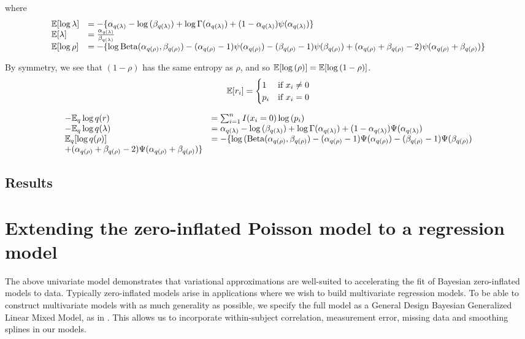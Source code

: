 \documentclass{amsart}
\begin{document}
where
$$
\begin{array}{ll}
{\mathbb E} [\log{\lambda}] &= -\{ \alpha_{q(\lambda)} - \log{(\beta_{q(\lambda)})} + \log{\Gamma(\alpha_{q(\lambda)})} + (1 - \alpha_{q(\lambda)}) \psi{(\alpha_{q(\lambda)})} \} \\
{\mathbb E} [\lambda] &= \frac{\alpha_{q(\lambda)}}{\beta_{q(\lambda)}} \\
{\mathbb E}[\log{\rho}] &= - \{ \log{\text{Beta}(\alpha_{q(\rho)}, \beta_{q(\rho)})} - (\alpha_{q(\rho)} - 1) \psi{(\alpha_{q(\rho)})} - (\beta_{q(\rho)} - 1)\psi{(\beta_{q(\rho)})} + (\alpha_{q(\rho)} + \beta_{q(\rho)} - 2)\psi{(\alpha_{q(\rho)} + \beta_{q(\rho)})} \} \\
\end{array}
$$

By symmetry, we see that $(1 - \rho)$ has the same entropy as $\rho$,
and so ${\mathbb E} [\log{(\rho)}] = {\mathbb E} [\log{(1 - \rho)}]$.
$$
{\mathbb E}[r_i] = 
	\begin{cases}
	1 & \text{if } x_i \ne 0 \\
	p_i & \text{if } x_i = 0 \\
	\end{cases}
$$

$$
\begin{array}{ll}
-{\mathbb E}_q \log{q(r)} &= \sum_{i=1}^n I(x_i = 0) \log{(p_i)} \\
-{\mathbb E}_q \log{q(\lambda)} &= \alpha_{q(\lambda)} - \log{(\beta_{q(\lambda)})} + \log{\Gamma{(\alpha_{q(\lambda)})}} + (1 - \alpha_{q(\lambda)}) \Psi{(\alpha_{q(\lambda)})} \\
{\mathbb E}_q[\log{q(\rho)}] &= - \{ \log{(\text{Beta}(\alpha_{q(\rho)}, \beta_{q(\rho)})} - (\alpha_{q(\rho)} - 1) \Psi{(\alpha_{q(\rho)})} - (\beta_{q(\rho)} - 1)\Psi{(\beta_{q(\rho)})} \\
+ (\alpha_{q(\rho)} + \beta_{q(\rho)} - 2)\Psi{(\alpha_{q(\rho)} + \beta_{q(\rho)})} \} \\
\end{array}
$$

\subsection{Results}

\section{Extending the zero-inflated Poisson model to a regression model}
The above univariate model demonstrates that variational approximations are well-suited
to accelerating the fit of Bayesian zero-inflated models to data. Typically zero-inflated
models arise in applications where we wish to build multivariate regression models. To be able to
construct multivariate models with as much generality as possible, we specify the full
model as a General Design Bayesian Generalized Linear Mixed Model, as in \cite{zhao06}.
This allows us to incorporate within-subject correlation, measurement error, missing data
and smoothing splines in our models.
\end{document}
